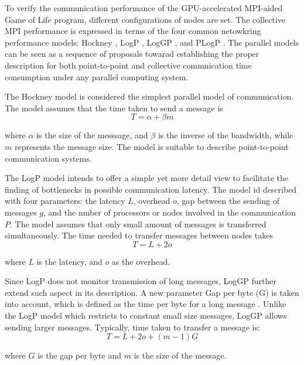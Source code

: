 
To verify the communication performance of the GPU-accelerated MPI-aided Game of Life program, different configurations of nodes are set. The collective MPI performance is expressed in terms of the four common netowkring performance models: Hockney \cite{hockney1994communication}, LogP \cite{culler1993logp}, LogGP \cite{alexandrov1995loggp}, and PLogP \cite{kielmann2000fast}. The parallel models can be seen as a sequence of proposals towarad establishing the proper description for both point-to-point and collective commnication time consumption under any parallel computing system. 

The Hockney model is considered the simplest parallel model of communication. The model assumes that the time taken to send a message is 
\begin{equation*}
T = \alpha + \beta m
\end{equation*}

where $\alpha$ is the size of the messsage, and $\beta$ is the inverse of the bandwidth, while $m$ represents the message size. The model is suitable to describe point-to-point communication systems. 

The LogP model intends to offer a simple yet more detail view to facilitate the finding of bottlenecks in possible communication latency. The model id described with four parameters: the latency $L$, overhead $o$, gap between the sending of messages $g$, and the nmber of processors or nodes involved in the communication $P$. The model assumes that only small amount of messages is transferred simultaneously. The time needed to transfer messages between nodes takes 
\begin{equation*}
T = L + 2o
\end{equation*}

where $L$ is the latency, and $o$ as the overhead.

Since LogP does not monitor transmission of long messages, LogGP further extend such aspect in its description. A new parameter  Gap per byte (G) is taken into account, which is defined as the time per byte for a long message \cite{alexandrov1995loggp}. Unlike the LogP model which restricts to constant small size messages, LogGP allows sending larger messages. Typically, time taken to transfer a message is:
\begin{equation*}
T = L + 2o + (m - 1)G
\end{equation*}

where $G$ is the gap per byte and $m$ is the size of the message.

